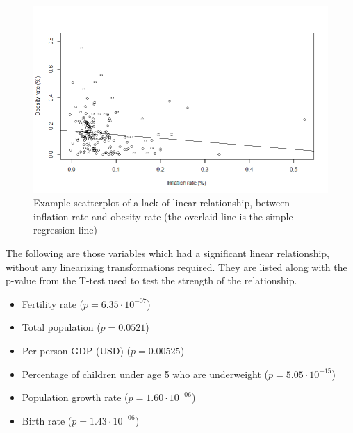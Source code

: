\documentclass[oneside,12pt]{report}
\begin{document}
\begin{figure}
\centering
\label{fig:inflation-obesity-scatter}
\includegraphics[width=\textwidth]{inflation-obrate-scatter.png}
\caption[Scatterplot of a lack of linear relationship]{Example scatterplot of a lack of linear relationship, between inflation rate and obesity rate (the overlaid line is the simple regression line)}
\end{figure}

The following are those variables which had a significant linear relationship, without any linearizing transformations required. They are listed along with the p-value from the T-test used to test the strength of the relationship.

\begin{itemize}
\item Fertility rate (\begin{math}p=6.35\cdot10^{-07}\end{math})
\item Total population (\begin{math}p=0.0521\end{math})
\item Per person GDP (USD) (\begin{math}p=0.00525\end{math})
\item Percentage of children under age 5 who are underweight (\begin{math}p=5.05\cdot10^{-15}\end{math})
\item Population growth rate (\begin{math}p=1.60\cdot10^{-06}\end{math})
\item Birth rate (\begin{math}p=1.43\cdot10^{-06}\end{math})
\end{itemize}
\end{document}
